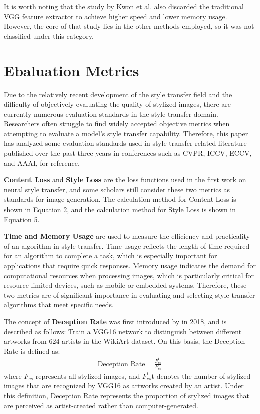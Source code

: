 \documentclass[preprint,12pt]{elsarticle}
\begin{document}
It is worth noting that the study by Kwon et al.\citep{71kwon2024aesfa} also discarded the traditional VGG\citep{25simonyan2014very} feature extractor to achieve higher speed and lower memory usage. However, the core of that study lies in the other methods employed, so it was not classified under this category.

% 
\section{Ebaluation Metrics}

Due to the relatively recent development of the style transfer field\citep{02gatys2016image} and the difficulty of objectively evaluating the quality of stylized images, there are currently numerous evaluation standards in the style transfer domain. Researchers often struggle to find widely accepted objective metrics when attempting to evaluate a model's style transfer capability. Therefore, this paper has analyzed some evaluation standards used in style transfer-related literature published over the past three years in conferences such as CVPR, ICCV, ECCV, and AAAI, for reference.

\textbf{Content Loss} and \textbf{Style Loss} are the loss functions used in the first work on neural style transfer\citep{02gatys2016image}, and some scholars still consider these two metrics as standards for image generation. The calculation method for Content Loss is shown in Equation 2, and the calculation method for Style Loss is shown in Equation 5.

\textbf{Time and Memory Usage} are used to measure the efficiency and practicality of an algorithm in style transfer. Time usage reflects the length of time required for an algorithm to complete a task, which is especially important for applications that require quick responses. Memory usage indicates the demand for computational resources when processing images, which is particularly critical for resource-limited devices, such as mobile or embedded systems. Therefore, these two metrics are of significant importance in evaluating and selecting style transfer algorithms that meet specific needs.

The concept of \textbf{Deception Rate} was first introduced by\citep{73sanakoyeu2018style} in 2018, and is described as follows: Train a VGG16 network to distinguish between different artworks from 624 artists in the WikiArt dataset. On this basis, the Deception Rate is defined as:
\begin{equation}
    \begin{aligned}
        \text{Deception Rate} = \frac{F_{cs}^t}{F_{cs}}
    \end{aligned}
\end{equation}
where $F_{cs}$ represents all stylized images, and  $F_{cs}^t$t denotes the number of stylized images that are recognized by VGG16 as artworks created by an artist. Under this definition, Deception Rate represents the proportion of stylized images that are perceived as artist-created rather than computer-generated.
\end{document}
